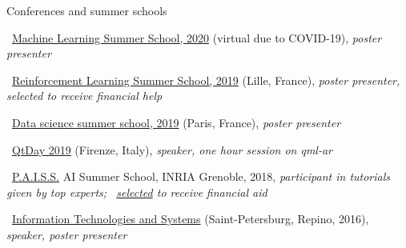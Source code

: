 \documentclass{resume} %
\newcommand*{\img}[1]{%
	\raisebox{-.02\baselineskip}{%
		\texttt{[image: \#1]}%
	}%
}
\newcommand*{\emoji}[1]{\img{./emoji/\imgpref#1.png}}
\newcommand*{\mybold}[1]{{\color{pinkunderline} #1}}
\def\imgpref{bleak-}
\newcommand{\mylink}{{\color{gray}\faExternalLink}}
\begin{document}
\begin{rSection}{Conferences and summer schools}
\vspace{-1em}
\item \emoji{flag-de} \mylink~\href{http://mlss.tuebingen.mpg.de/2020/}{Machine Learning Summer School, 2020} (virtual due to COVID-19){, \em \mybold{poster} presenter}
\item \emoji{flag-fr} \mylink~\href{https://rlss.inria.fr}{Reinforcement Learning Summer School, 2019} (Lille, France){, \em \mybold{poster} presenter, selected to receive \mybold{financial help}}
\item \emoji{flag-fr} \mylink~\href{https://ds3-datascience-polytechnique.fr}{Data science summer school, 2019} (Paris, France){, \em \mybold{poster} presenter}
\item \emoji{flag-it} \mylink~\href{https://youtu.be/rmaAGNuKy3c}{QtDay 2019} (Firenze, Italy){, \em \mybold{speaker,} one hour session on qml-ar}
\item \emoji{flag-fr} \mylink~\href{https://project.inria.fr/paiss/}{P.A.I.S.S.} AI Summer School, INRIA Grenoble, 2018{, \em participant in tutorials given by top experts; \mylink~\href{http://www.europe.naverlabs.com/Blog/Students-at-PAISS}{selected} to receive financial aid }
\item \emoji{flag-ru} \mylink~\href{http://iitp.ru/en/conferences/itas}{Information Technologies and Systems} (Saint-Petersburg, Repino, 2016){, \em \mybold{speaker,} poster presenter}
\end{rSection}
\end{document}
